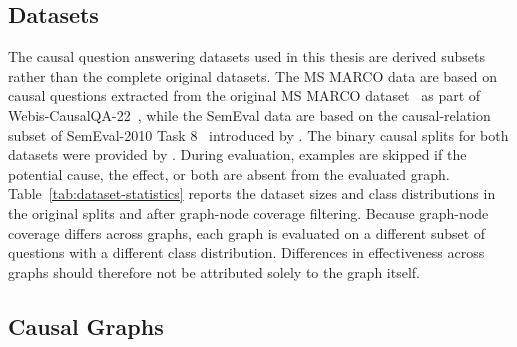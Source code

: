 \subsection{Datasets}
\label{sec:results-datasets}

The causal question answering datasets used in this thesis are derived subsets rather than the complete original datasets. The MS MARCO data are based on causal questions extracted from the original MS MARCO dataset~\citep{nguyen:2016} as part of Webis-CausalQA-22~\citep{bondarenko:2022}, while the SemEval data are based on the causal-relation subset of SemEval-2010 Task 8~\citep{hendrickx:2010} introduced by \citet{sharp:2016}. The binary causal splits for both datasets were provided by \citet{bluebaum:2024}. During evaluation, examples are skipped if the potential cause, the effect, or both are absent from the evaluated graph. Table~\ref{tab:dataset-statistics} reports the dataset sizes and class distributions in the original splits and after graph-node coverage filtering. Because graph-node coverage differs across graphs, each graph is evaluated on a different subset of questions with a different class distribution. Differences in effectiveness across graphs should therefore not be attributed solely to the graph itself.



\subsection{Causal Graphs}
\label{sec:results-graphs}


